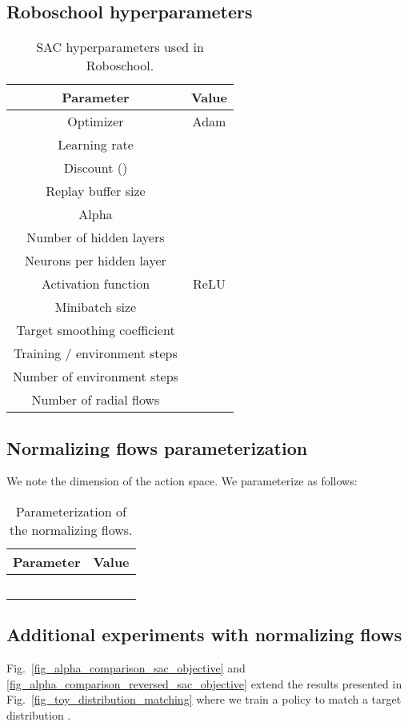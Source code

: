 \documentclass[letterpaper]{article} \usepackage{aaai20}  \usepackage{times}  \usepackage{helvet} \usepackage{courier}  \usepackage[hyphens]{url}  \usepackage{graphicx} \urlstyle{rm} \def\UrlFont{\rm}  \usepackage{graphicx}  \usepackage[section]{placeins}
\begin{document}
\subsection{Roboschool hyperparameters}

\begin{table}[!htbp]
\centering
 \begin{tabular}{c | c} 
 \hline
  Parameter & Value \\ \hline
  Optimizer & Adam \\
  Learning rate &  \\
  Discount () &  \\
  Replay buffer size &  \\
  Alpha &  \\
  Number of hidden layers &  \\
  Neurons per hidden layer &  \\
  Activation function & ReLU \\
  Minibatch size &  \\
  Target smoothing coefficient &  \\
  Training / environment steps&  \\
  Number of environment steps &  \\
  Number of radial flows &  \\
  \hline
\end{tabular}
\caption{SAC hyperparameters used in Roboschool.}
\label{robochool_hyperparameters}
\end{table}

\subsection{Normalizing flows parameterization}

We note  the dimension of the action space. We parameterize  as follows:

\begin{table}[!htbp]
\centering
 \begin{tabular}{c | c} 
 \hline
 Parameter & Value\\
 \hline
   &  \\ 
  \hline
   &  \\ 
  \hline
   &  \\ 
  \hline
   &  \\
  \hline
   &  \\ 
  \hline
\end{tabular}
\caption{Parameterization of the normalizing flows.}
\label{nflows_parameterization}
\end{table}

\subsection{Additional experiments with normalizing flows}

Fig.~\ref{fig_alpha_comparison_sac_objective} and \ref{fig_alpha_comparison_reversed_sac_objective} extend the results presented in Fig.~\ref{fig_toy_distribution_matching} where we train a policy  to match a target distribution .
\end{document}
